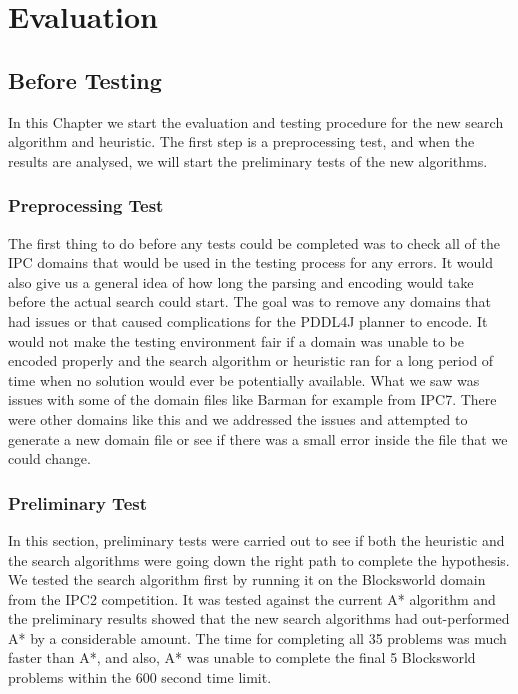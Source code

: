 \chapter{Evaluation} %

\label{Chapter4} %
\section{Before Testing}
In this Chapter we start the evaluation and testing procedure for the new search algorithm and heuristic. The first step is a preprocessing test, and when the results are analysed, we will start the preliminary tests of the new algorithms. 
\subsection{Preprocessing Test} 
The first thing to do before any tests could be completed was to check all of the IPC domains that would be used in the testing process for any errors. It would also give us a general idea of how long the parsing and encoding would take before the actual search could start. The goal was to remove any domains that had issues or that caused complications for the PDDL4J planner to encode. It would not make the testing environment fair if a domain was unable to be encoded properly and the search algorithm or heuristic ran for a long period of time when no solution would ever be potentially available. 
What we saw was issues with some of the domain files like Barman for example from IPC7. There were other domains like this and we addressed the issues and attempted to generate a new domain file or see if there was a small error inside the file that we could change.
\subsection{Preliminary Test}
In this section, preliminary tests were carried out to see if both the heuristic and the search algorithms were going down the right path to complete the hypothesis. We tested the search algorithm first by running it on the Blocksworld domain from the IPC2 competition. It was tested against the current A* algorithm and the preliminary results showed that the new search algorithms had out-performed A* by a considerable amount. The time for completing all 35 problems was much faster than A*, and also, A* was unable to complete the final 5 Blocksworld problems within the 600 second time limit. 

